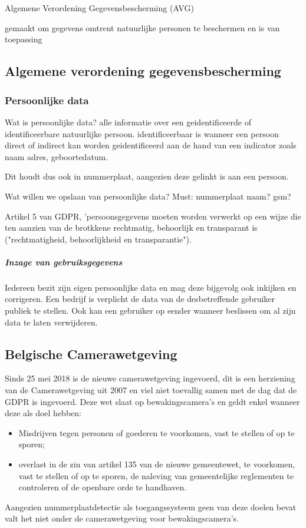 
\chapter{}
\label{ch:richtlijnengdpr}

Algemene Verordening Gegevensbescherming (AVG)

gemaakt om gegevens omtrent natuurlijke personen te beschermen en is van toepassing 

\section{Algemene verordening gegevensbescherming}
\subsection{Persoonlijke data}
Wat is persoonlijke data?
alle informatie over een geidentificeerde of identificeerbare natuurlijke persoon.
identificeerbaar is wanneer een persoon direct of indirect kan worden geidentificeerd aan de hand van een indicator zoals naam adres, geboortedatum.

Dit houdt dus ook in nummerplaat, aangezien deze gelinkt is aan een persoon.


Wat willen we opslaan van persoonlijke data?
Must: nummerplaat
naam?
gsm?

Artikel 5 van GDPR, 'persoonsgegevens moeten worden verwerkt op een wijze die ten aanzien van de brotkkene rechtmatig, behoorlijk en transparant is ("rechtmatigheid, behoorlijkheid en transparantie").

\paragraph{Inzage van gebruiksgegevens}
Iedereen bezit zijn eigen persoonlijke data en mag deze bijgevolg ook inkijken en corrigeren. Een bedrijf is verplicht de data van de desbetreffende gebruiker publiek te stellen. Ook kan een gebruiker op eender wanneer beslissen om al zijn data te laten verwijderen.

\section{Belgische Camerawetgeving}
Sinds 25 mei 2018 is de nieuwe camerawetgeving ingevoerd, dit is een herziening van de Camerawetgeving uit 2007 en viel niet toevallig samen met de dag dat de GDPR is ingevoerd. Deze wet slaat op bewakingscamera's en geldt enkel wanneer deze als doel hebben:
\begin{itemize}
	\item Misdrijven tegen personen of goederen te voorkomen, vast te stellen of op te sporen;
	\item overlast in de zin van artikel 135 van de nieuwe gemeentewet, te voorkomen, vast te stellen of op te sporen, de naleving van gemeentelijke reglementen te controleren of de openbare orde te handhaven.
\end{itemize}
Aangezien nummerplaatdetectie als toegangssysteem geen van deze doelen bevat valt het niet onder de camerawetgeving voor bewakingscamera's. \autocite{staatsblad2007wet}

